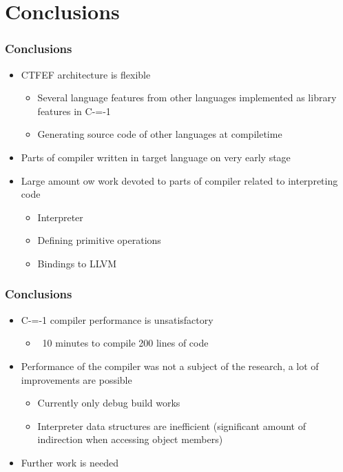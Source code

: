 \section{Conclusions}

\begin{frame}
    \frametitle{Conclusions}

    \begin{itemize}
        \item CTFEF architecture is flexible \begin{itemize}
            \item Several language features from other languages implemented as library features in C-=-1
            \item Generating source code of other languages at compiletime
        \end{itemize}
        \item Parts of compiler written in target language on very early stage
        \item Large amount ow work devoted to parts of compiler related to interpreting code\begin{itemize}
            \item Interpreter
            \item Defining primitive operations
            \item Bindings to LLVM
        \end{itemize}
    \end{itemize}

\end{frame}

\begin{frame}
    \frametitle{Conclusions}

    \begin{itemize}
        \item C-=-1 compiler performance is unsatisfactory\begin{itemize}
            \item ~10 minutes to compile 200 lines of code
        \end{itemize}
        \item Performance of the compiler was not a subject of the research, a lot of improvements are possible\begin{itemize}
            \item Currently only debug build works
            \item Interpreter data structures are inefficient (significant amount of indirection when accessing object members)
        \end{itemize}
        \item Further work is needed
    \end{itemize}

\end{frame}
